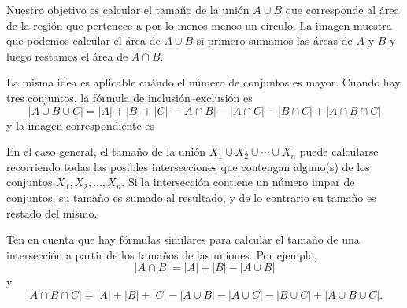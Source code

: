 \begin{center}
\end{center}

Nuestro objetivo es calcular el tamaño de la unión $A \cup B$ que corresponde
al área de la región que pertenece a por lo menos menos un círculo. La imagen
muestra que podemos calcular el área de $A \cup B$ si primero sumamos las
áreas de $A$ y $B$ y luego restamos el área de $A \cap B$.

La misma idea es aplicable cuándo el número de conjuntos es mayor. Cuando
hay tres conjuntos, la fórmula de inclusión--exclusión es
\[ |A \cup B \cup C| = |A| + |B| + |C| - |A \cap B|  - |A \cap C|  - |B \cap C| + |A \cap B \cap C| \]
y la imagen correspondiente es

\begin{center}
\end{center}

En el caso general, el tamaño de la unión $X_1 \cup X_2 \cup \cdots \cup X_n$
puede calcularse recorriendo todas las posibles intersecciones que contengan
alguno(s) de los conjuntos $X_1,X_2,\ldots,X_n$. Si la intersección contiene
un número impar de conjuntos, su tamaño es sumado al resultado, y de lo
contrario su tamaño es restado del mismo.

Ten en cuenta que hay fórmulas similares para calcular el tamaño de una
intersección a partir de los tamaños de las uniones. Por ejemplo,
\[ |A \cap B| = |A| + |B| - |A \cup B|\]
y
\[ |A \cap B \cap C| = |A| + |B| + |C| - |A \cup B|  - |A \cup C|  - |B \cup C| + |A \cup B \cup C| .\]

